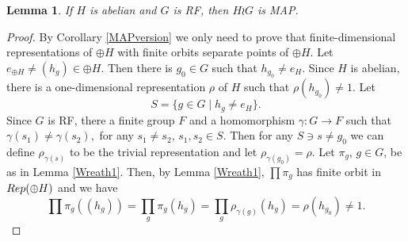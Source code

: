 \documentclass[11 pt, leqno, hidelinks]{amsart}%
\theoremstyle{plain}
\newtheorem{lemma}[theorem]{Lemma}
\numberwithin{equation}{section}
\newcommand{\Rep}{\textup{Rep}}
\begin{document}
\begin{lemma}\label{Wreath2} If $H$ is abelian and $G$ is RF, then $H\wr G$ is MAP.
\end{lemma}
\begin{proof} By  Corollary \ref{MAPversion} we only need to prove that finite-dimensional representations of $\oplus H$ with finite orbits separate points of $\oplus H$.  Let $e_{\oplus H} \neq (h_g) \in \oplus H$. Then there is $g_0\in G$ such that $h_{g_0}\neq e_H$.  Since $H$ is abelian, there is a one-dimensional representation $\rho$ of $H$ such that $\rho(h_{g_0})\neq 1$. Let $$S = \{g\in G \;|\; h_g \neq e_H\}.$$ Since $G$ is RF, there a finite group $F$ and a homomorphism $\gamma: G \to F$ such that $\gamma(s_1) \neq \gamma(s_2), $ for any $s_1\neq s_2$, $s_1, s_2 \in S$.   Then  for any $S \ni s\neq g_0$ we can define  $\rho_{\gamma(s)} $ to be the trivial representation and let
$ \rho_{\gamma(g_0)} = \rho$.  Let $\pi_g$, $g\in G$, be as in Lemma \ref{Wreath1}. Then, by  Lemma \ref{Wreath1}, $\prod\pi_g$ has   finite orbit in $\Rep(\oplus H)$ and we have
$$ \prod\pi_g ((h_g))  = \prod_g \pi_g(h_g) = \prod_g\rho_{\gamma(g)}(h_g) = \rho(h_{g_0}) \neq 1.$$
\end{proof}
\end{document}
